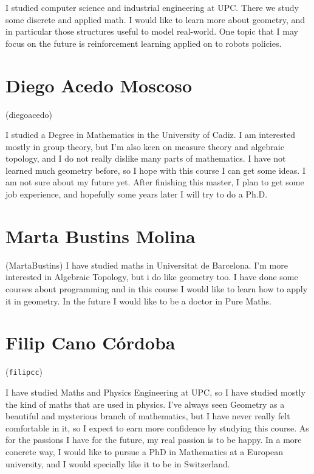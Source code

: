 \documentclass[11pt]{amsart}
\begin{document}
I  studied computer science and industrial engineering at UPC. There we study some discrete and applied math. I would like to learn more about geometry, and in particular those structures useful to model real-world. One topic that I may focus on the future is reinforcement learning applied on to robots policies. 

\section*{Diego Acedo Moscoso}
(diegoacedo)

I studied a Degree in Mathematics in the University of Cadiz. I am interested mostly in group theory, but I'm also keen on measure theory and algebraic topology, and I do not really dislike many parts of mathematics. I have not learned much geometry before, so I hope with this course I can get some ideas.
I am not sure about my future yet. After finishing this master, I plan to get some job experience, and hopefully some years later I will try to do a Ph.D.

\medskip

\section*{Marta Bustins Molina} 
(MartaBustins) 
I have studied maths in Universitat de Barcelona. I'm more interested in Algebraic Topology, but i do like geometry too. I have done some courses about programming and in this course I would like to learn how to apply it in geometry. In the future I would like to be a doctor in Pure Maths.

\medskip

\section*{Filip Cano Córdoba}
(\texttt{filipcc})

I have studied Maths and Physics Engineering at UPC,
so I have studied mostly the kind of maths that are used in physics.
I've always seen Geometry as a beautiful and mysterious branch of mathematics,
but I have never really felt comfortable in it, so I expect to earn more confidence by
studying this course.  
As for the passions I have for the future, 
my real passion is to be happy. 
In a more concrete way, I would like to pursue a PhD in Mathematics at a European 
university, and I would specially like it to be in Switzerland.
\end{document}
